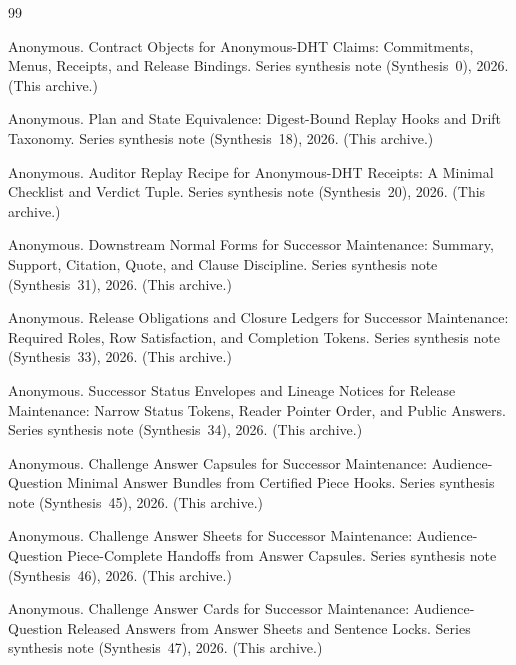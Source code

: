 \documentclass[11pt]{article}
\begin{document}
\begin{thebibliography}{99}\small

Anonymous.
\newblock Contract Objects for Anonymous-DHT Claims: Commitments, Menus, Receipts, and Release Bindings.
\newblock Series synthesis note (Synthesis~0), 2026. (This archive.)

Anonymous.
\newblock Plan and State Equivalence: Digest-Bound Replay Hooks and Drift Taxonomy.
\newblock Series synthesis note (Synthesis~18), 2026. (This archive.)

Anonymous.
\newblock Auditor Replay Recipe for Anonymous-DHT Receipts: A Minimal Checklist and Verdict Tuple.
\newblock Series synthesis note (Synthesis~20), 2026. (This archive.)

Anonymous.
\newblock Downstream Normal Forms for Successor Maintenance: Summary, Support, Citation, Quote, and Clause Discipline.
\newblock Series synthesis note (Synthesis~31), 2026. (This archive.)

Anonymous.
\newblock Release Obligations and Closure Ledgers for Successor Maintenance: Required Roles, Row Satisfaction, and Completion Tokens.
\newblock Series synthesis note (Synthesis~33), 2026. (This archive.)

Anonymous.
\newblock Successor Status Envelopes and Lineage Notices for Release Maintenance: Narrow Status Tokens, Reader Pointer Order, and Public Answers.
\newblock Series synthesis note (Synthesis~34), 2026. (This archive.)

Anonymous.
\newblock Challenge Answer Capsules for Successor Maintenance: Audience-Question Minimal Answer Bundles from Certified Piece Hooks.
\newblock Series synthesis note (Synthesis~45), 2026. (This archive.)

Anonymous.
\newblock Challenge Answer Sheets for Successor Maintenance: Audience-Question Piece-Complete Handoffs from Answer Capsules.
\newblock Series synthesis note (Synthesis~46), 2026. (This archive.)

Anonymous.
\newblock Challenge Answer Cards for Successor Maintenance: Audience-Question Released Answers from Answer Sheets and Sentence Locks.
\newblock Series synthesis note (Synthesis~47), 2026. (This archive.)


\end{thebibliography}
\end{document}
